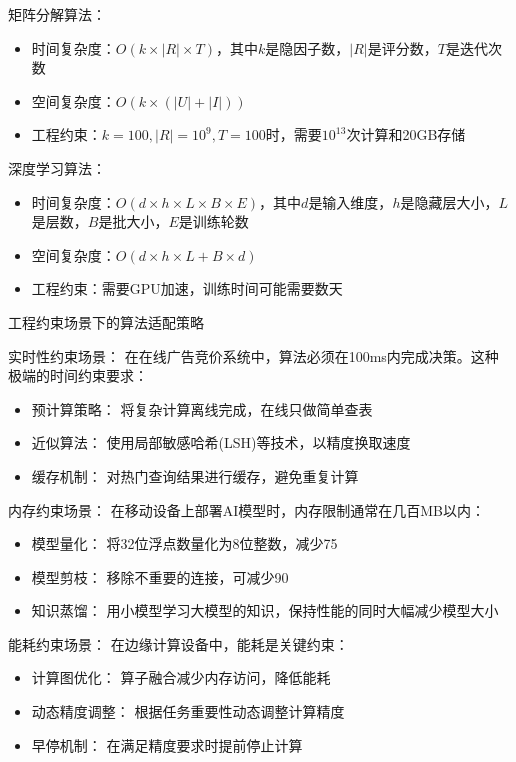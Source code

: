 矩阵分解算法：
\begin{itemize}
\item 时间复杂度：$O(k \times |R| \times T)$，其中$k$是隐因子数，$|R|$是评分数，$T$是迭代次数
\item 空间复杂度：$O(k \times (|U| + |I|))$
\item 工程约束：$k=100, |R|=10^9, T=100$时，需要$10^{13}$次计算和20GB存储
\end{itemize}

深度学习算法：
\begin{itemize}
\item 时间复杂度：$O(d \times h \times L \times B \times E)$，其中$d$是输入维度，$h$是隐藏层大小，$L$是层数，$B$是批大小，$E$是训练轮数
\item 空间复杂度：$O(d \times h \times L + B \times d)$
\item 工程约束：需要GPU加速，训练时间可能需要数天
\end{itemize}

工程约束场景下的算法适配策略

实时性约束场景：
在在线广告竞价系统中，算法必须在100ms内完成决策。这种极端的时间约束要求：

\begin{itemize}
\item 预计算策略： 将复杂计算离线完成，在线只做简单查表
\item 近似算法： 使用局部敏感哈希(LSH)等技术，以精度换取速度
\item 缓存机制： 对热门查询结果进行缓存，避免重复计算
\end{itemize}

内存约束场景：
在移动设备上部署AI模型时，内存限制通常在几百MB以内：

\begin{itemize}
\item 模型量化： 将32位浮点数量化为8位整数，减少75%
\item 模型剪枝： 移除不重要的连接，可减少90%
\item 知识蒸馏： 用小模型学习大模型的知识，保持性能的同时大幅减少模型大小
\end{itemize}

能耗约束场景：
在边缘计算设备中，能耗是关键约束：

\begin{itemize}
\item 计算图优化： 算子融合减少内存访问，降低能耗
\item 动态精度调整： 根据任务重要性动态调整计算精度
\item 早停机制： 在满足精度要求时提前停止计算
\end{itemize}

